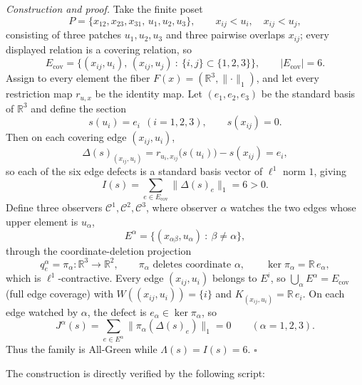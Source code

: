 \documentclass[
  11pt,
]{article}
\begin{document}
\emph{Construction and proof.} Take the finite poset
\[
P=\{x_{12},x_{23},x_{31},\,u_1,u_2,u_3\},
\qquad
x_{ij}<u_i,\quad x_{ij}<u_j,
\]
consisting of three patches \(u_1,u_2,u_3\) and three pairwise overlaps \(x_{ij}\); every displayed relation is a covering relation, so
\[
E_{\mathrm{cov}}=\bigl\{(x_{ij},u_i),\,(x_{ij},u_j)\ :\ \{i,j\}\subset\{1,2,3\}\bigr\},
\qquad |E_{\mathrm{cov}}|=6 .
\]
Assign to every element the fiber \(F(x)=(\mathbb R^3,\lVert\cdot\rVert_1)\), and let every restriction map \(r_{u,x}\) be the identity map. Let \((e_1,e_2,e_3)\) be the standard basis of \(\mathbb R^3\) and define the section
\[
s(u_i)=e_i\ \ (i=1,2,3),
\qquad
s(x_{ij})=0 .
\]
Then on each covering edge \((x_{ij},u_i)\),
\[
\Delta(s)_{(x_{ij},u_i)}
= r_{u_i,x_{ij}}\bigl(s(u_i)\bigr)-s(x_{ij})
= e_i ,
\]
so each of the six edge defects is a standard basis vector of \(\ell^1\) norm \(1\), giving
\[
I(s)=\sum_{e\in E_{\mathrm{cov}}}\lVert\Delta(s)_e\rVert_1 = 6 > 0 .
\]
Define three observers \(\mathcal C^1,\mathcal C^2,\mathcal C^3\), where observer \(\alpha\) watches the two edges whose upper element is \(u_\alpha\),
\[
E^\alpha=\bigl\{(x_{\alpha\beta},u_\alpha)\ :\ \beta\neq\alpha\bigr\},
\]
through the coordinate-deletion projection
\[
q_e^\alpha=\pi_\alpha:\mathbb R^3\to\mathbb R^2,
\qquad
\pi_\alpha \text{ deletes coordinate } \alpha,
\qquad
\ker\pi_\alpha=\mathbb R\,e_\alpha ,
\]
which is \(\ell^1\)-contractive. Every edge \((x_{ij},u_i)\) belongs to \(E^i\), so \(\bigcup_\alpha E^\alpha=E_{\mathrm{cov}}\) (full edge coverage) with \(W((x_{ij},u_i))=\{i\}\) and \(K_{(x_{ij},u_i)}=\mathbb R\,e_i\). On each edge watched by \(\alpha\), the defect is \(e_\alpha\in\ker\pi_\alpha\), so
\[
J^\alpha(s)=\sum_{e\in E^\alpha}\lVert\pi_\alpha(\Delta(s)_e)\rVert_1=0
\qquad(\alpha=1,2,3).
\]
Thus the family is All-Green while \(\Lambda(s)=I(s)=6\). \(\square\)

The construction is directly verified by the following script:
\end{document}
